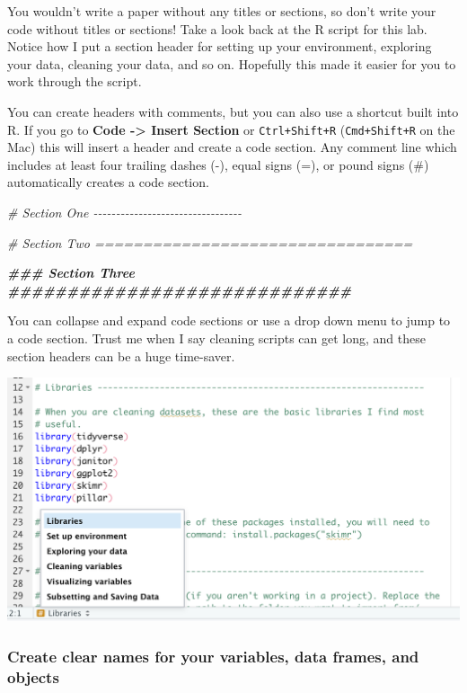 \documentclass[
]{book}
\newenvironment{Shaded}{\begin{snugshade}}{\end{snugshade}}
\newcommand{\CommentTok}[1]{\textcolor[rgb]{0.56,0.35,0.01}{\textit{#1}}}
\newcommand{\DocumentationTok}[1]{\textcolor[rgb]{0.56,0.35,0.01}{\textbf{\textit{#1}}}}
\begin{document}
You wouldn't write a paper without any titles or sections, so don't write your code without titles or sections! Take a look back at the R script for this lab. Notice how I put a section header for setting up your environment, exploring your data, cleaning your data, and so on. Hopefully this made it easier for you to work through the script.

You can create headers with comments, but you can also use a shortcut built into R. If you go to \textbf{Code -\textgreater{} Insert Section} or \texttt{Ctrl+Shift+R} (\texttt{Cmd+Shift+R} on the Mac) this will insert a header and create a code section. Any comment line which includes at least four trailing dashes (-), equal signs (=), or pound signs (\#) automatically creates a code section.

\begin{Shaded}
\begin{Highlighting}[]
 \CommentTok{\# Section One {-}{-}{-}{-}{-}{-}{-}{-}{-}{-}{-}{-}{-}{-}{-}{-}{-}{-}{-}{-}{-}{-}{-}{-}{-}{-}{-}{-}{-}{-}{-}{-}{-}}
 
 \CommentTok{\# Section Two =================================}
 
 \DocumentationTok{\#\#\# Section Three \#\#\#\#\#\#\#\#\#\#\#\#\#\#\#\#\#\#\#\#\#\#\#\#\#\#\#\#\# }
\end{Highlighting}
\end{Shaded}

You can collapse and expand code sections or use a drop down menu to jump to a code section. Trust me when I say cleaning scripts can get long, and these section headers can be a huge time-saver.

\includegraphics[width=0.75\linewidth]{images/jumpmenu}

\hypertarget{create-clear-names-for-your-variables-data-frames-and-objects}{%
\subsubsection*{Create clear names for your variables, data frames, and objects}\label{create-clear-names-for-your-variables-data-frames-and-objects}}
\end{document}
